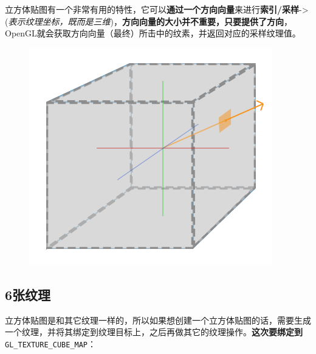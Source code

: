 \documentclass[UTF8,a4paper,12pt]{ctexbook}
\begin{document}
		立方体贴图有一个非常有用的特性，它可以\textbf{通过一个方向向量}来进行\textbf{索引/采样}->(\textit{表示纹理坐标，既而是三维})，\textbf{方向向量的大小并不重要，只要提供了方向}，OpenGL就会获取方向向量（最终）所击中的纹素，并返回对应的采样纹理值。

		\begin{figure}[H]
			\centering
			\includegraphics[width=.68\linewidth]{cubemaps_sampling}
		\end{figure}
		
		\subsection{6张纹理}
			立方体贴图是和其它纹理一样的，所以如果想创建一个立方体贴图的话，需要生成一个纹理，并将其绑定到纹理目标上，之后再做其它的纹理操作。\textbf{这次要绑定到}\verb|GL_TEXTURE_CUBE_MAP|：
			
\end{document}
